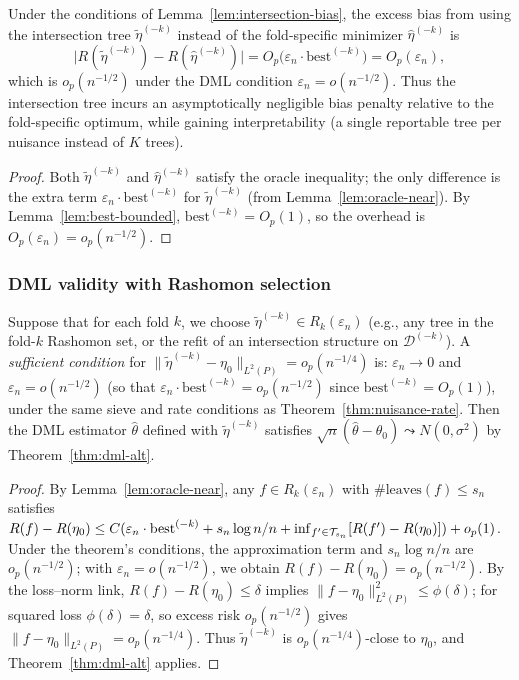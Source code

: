 \documentclass[12pt]{article}
\begin{document}
\begin{corollary}
\label{cor:intersection-overhead}
Under the conditions of Lemma~\ref{lem:intersection-bias}, the excess bias from using the intersection tree $\tilde{\eta}^{(-k)}$ instead of the fold-specific minimizer $\hat\eta^{(-k)}$ is
\[
\bigl| R(\tilde{\eta}^{(-k)}) - R(\hat\eta^{(-k)}) \bigr| = O_p\bigl( \varepsilon_n \cdot \text{best}^{(-k)} \bigr) = O_p(\varepsilon_n),
\]
which is $o_p(n^{-1/2})$ under the DML condition $\varepsilon_n = o(n^{-1/2})$. Thus the intersection tree incurs an asymptotically negligible bias penalty relative to the fold-specific optimum, while gaining interpretability (a single reportable tree per nuisance instead of $K$ trees).
\end{corollary}

\begin{proof}
Both $\tilde{\eta}^{(-k)}$ and $\hat\eta^{(-k)}$ satisfy the oracle inequality; the only difference is the extra term $\varepsilon_n \cdot \text{best}^{(-k)}$ for $\tilde{\eta}^{(-k)}$ (from Lemma~\ref{lem:oracle-near}). By Lemma~\ref{lem:best-bounded}, $\text{best}^{(-k)} = O_p(1)$, so the overhead is $O_p(\varepsilon_n) = o_p(n^{-1/2})$.
\end{proof}

\subsubsection{DML validity with Rashomon selection}

\begin{proposition}
\label{prop:rashomon-dml}
Suppose that for each fold $k$, we choose $\tilde{\eta}^{(-k)} \in R_k(\varepsilon_n)$ (e.g., any tree in the fold-$k$ Rashomon set, or the refit of an intersection structure on $\mathcal{D}^{(-k)}$). A \emph{sufficient condition} for $\|\tilde{\eta}^{(-k)} - \eta_0\|_{L^2(P)} = o_p(n^{-1/4})$ is: $\varepsilon_n \to 0$ and $\varepsilon_n = o(n^{-1/2})$ (so that $\varepsilon_n \cdot \text{best}^{(-k)} = o_p(n^{-1/2})$ since $\text{best}^{(-k)} = O_p(1)$), under the same sieve and rate conditions as Theorem~\ref{thm:nuisance-rate}. Then the DML estimator $\hat\theta$ defined with $\tilde{\eta}^{(-k)}$ satisfies $\sqrt{n}(\hat\theta - \theta_0) \leadsto N(0, \sigma^2)$ by Theorem~\ref{thm:dml-alt}.
\end{proposition}
\begin{proof}
By Lemma~\ref{lem:oracle-near}, any $f \in R_k(\varepsilon_n)$ with $\#\text{leaves}(f) \le s_n$ satisfies $R(f) - R(\eta_0) \le C( \varepsilon_n \cdot \text{best}^{(-k)} + s_n \log n / n + \inf_{f' \in \mathcal{T}_{s_n}}[R(f') - R(\eta_0)] ) + o_p(1)$. Under the theorem's conditions, the approximation term and $s_n \log n / n$ are $o_p(n^{-1/2})$; with $\varepsilon_n = o(n^{-1/2})$, we obtain $R(f) - R(\eta_0) = o_p(n^{-1/2})$. By the loss--norm link, $R(f) - R(\eta_0) \le \delta$ implies $\|f - \eta_0\|_{L^2(P)}^2 \le \phi(\delta)$; for squared loss $\phi(\delta) = \delta$, so excess risk $o_p(n^{-1/2})$ gives $\|f - \eta_0\|_{L^2(P)} = o_p(n^{-1/4})$. Thus $\tilde{\eta}^{(-k)}$ is $o_p(n^{-1/4})$-close to $\eta_0$, and Theorem~\ref{thm:dml-alt} applies.
\end{proof}
\end{document}
